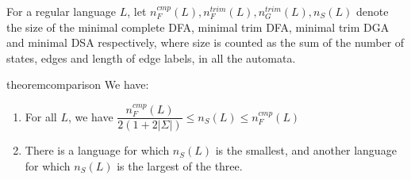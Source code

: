 For a regular language $L$, let
  $n_F^{cmp}(L), n_F^{trim}(L), n_G^{trim}(L), n_S(L)$ denote the size of the
  minimal complete DFA, minimal trim DFA, minimal trim DGA and minimal
  DSA respectively, where size is counted as the sum of the number of
  states, edges and length of edge labels, in all the automata. 

\begin{restatable}{theorem}{comparison}\label{thm:comparing-dsa-with-dfa-dga}
  We have:
  \begin{enumerate}
  \item For all $L$, we have $\dfrac{n_F^{cmp}(L)}{2 (1 + 2|\Sigma|)} \le n_S(L) \le n_F^{cmp}(L)$
  \item %
  There is a language for which $n_S(L)$ is the smallest, and another
    language for which $n_S(L)$ is the largest of the three.
  \end{enumerate}

\end{restatable}

